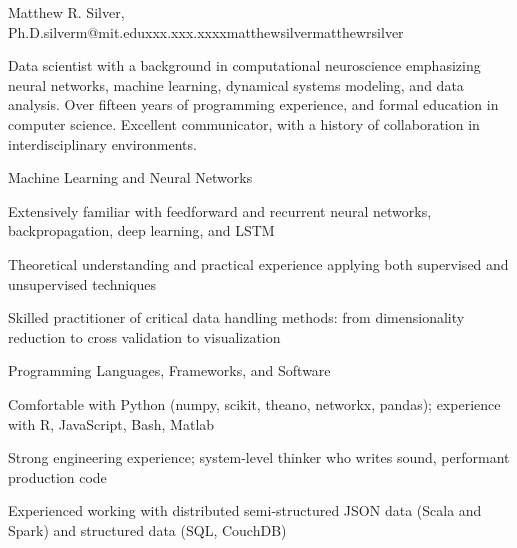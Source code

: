 \documentclass{report}
\begin{document}

  \begin{resume_header}{Matthew R. Silver, Ph.D.}{silverm@mit.edu}{xxx.xxx.xxxx}{matthewsilver}{matthewrsilver}

    Data scientist with a background in computational neuroscience emphasizing neural networks, machine learning, dynamical systems modeling, and data analysis. Over fifteen years of programming experience, and formal education in computer science. Excellent communicator, with a history of collaboration in interdisciplinary environments.

  \end{resume_header}





  \begin{skillset}{Machine Learning and Neural Networks}
    \item Extensively familiar with feedforward and recurrent neural networks, backpropagation, deep learning, and LSTM
    \item Theoretical understanding and practical experience applying both supervised and unsupervised techniques
    \item Skilled practitioner of critical data handling methods: from dimensionality reduction to cross validation to visualization
  \end{skillset}

  \begin{skillset}{Programming Languages, Frameworks, and Software}
    \item Comfortable with Python (numpy, scikit, theano, networkx, pandas); experience with R, JavaScript, Bash, Matlab
    \item Strong \CC{} engineering experience; system-level thinker who writes sound, performant production code
    \item Experienced working with distributed semi-structured JSON data (Scala and Spark) and structured data (SQL, CouchDB)
  \end{skillset}






\end{document}
